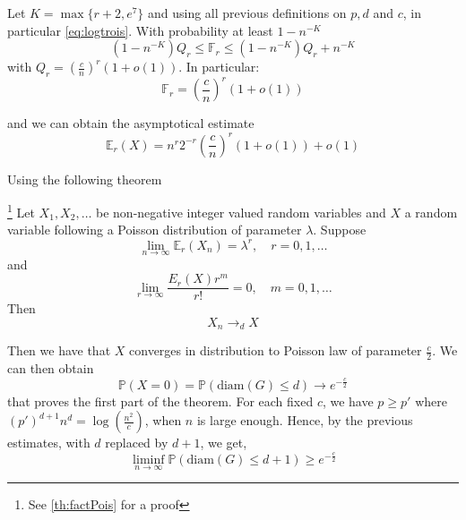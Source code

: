 	\begin{lemma}
		Let $K= \max\{r+2, e^7\}$ and using all previous definitions on $p, d$ and $c$, in particular \eqref{eq:logtrois}.
		With probability at least $1-n^{-K}$
		\begin{equation}
			(1-n^{-K})Q_r \leq \mathbb{F}_r \leq (1-n^{-K}) Q_r + n^{-K}
		\end{equation}
		with $Q_r = (\frac{c}{n})^r(1+o(1))$.
		\newline
		In particular:
		\begin{equation}
			\mathbb{F}_r = (\frac{c}{n})^r(1+o(1))
		\end{equation}

		and we can obtain the asymptotical estimate
		\begin{equation}
			\mathbb{E}_r(X) = n^r2^{-r}(\frac{c}{n})^r(1+o(1)) + o(1)
		\end{equation}
	\end{lemma}
	Using the following theorem 
	\begin{theorem}\footnote{See \eqref{th:factPois} for a proof}
		Let $X_1, X_2, \ldots$ be non-negative integer valued random variables and $X$ a random variable following a Poisson distribution of parameter $\lambda$.
		Suppose
		\begin{equation}
			\lim_{n\to\infty} \mathbb{E}_r(X_n) =\lambda^r , \quad r=0,1,\ldots
		\end{equation}
		and 
		\begin{equation}
			\lim_{r \to \infty} \frac{E_r(X) r^m}{r!} = 0,\quad m = 0, 1, \ldots
		\end{equation}
		Then 
		\begin{equation}
			X_n \longrightarrow_d X
		\end{equation}
	\end{theorem}
	Then we have that $X$ converges in distribution to Poisson law of parameter $\frac{c}{2}$.
	\newline
	We can then obtain 
	\begin{equation}\label{eq:diamcv}
		\mathbb{P}(X=0) = \mathbb{P}(\text{diam}(G) \leq d) \longrightarrow e^{-\frac{c}{2}}
	\end{equation}
	that proves the first part of the theorem. 
	For each fixed $c$, we have $p\geq p'$ where $(p')^{d+1}n^d = \log(\frac{n^2}{c})$, when $n$ is large enough.
	Hence, by the previous estimates, with $d$ replaced by $d+1$, we get,
	\begin{equation}
		\liminf_{n \to \infty} \mathbb{P}(\text{diam}(G) \leq d+1) \geq e^{-\frac{c}{2}}
	\end{equation}
